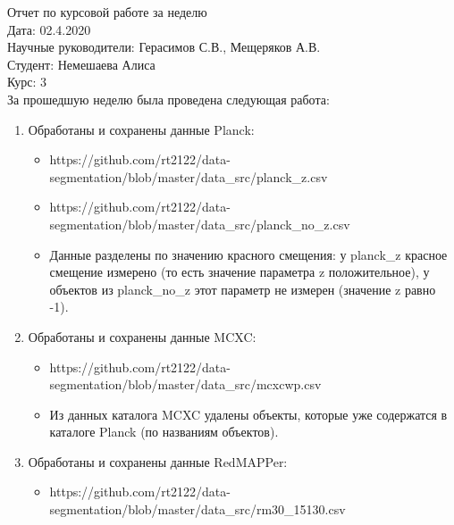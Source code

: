 \documentclass{article}
\begin{document}
Отчет по курсовой работе за неделю\\
Дата: 02.4.2020\\
Научные руководители: Герасимов С.В., Мещеряков А.В.\\
Студент: Немешаева Алиса\\
Курс: 3\\

\renewcommand{\labelitemi}{$\blacksquare$}
\renewcommand\labelitemii{$\square$}
За прошедшую неделю была проведена следующая работа:\\
\begin{enumerate}
    \item Обработаны и сохранены данные Planck: \\
        \begin{itemize}
            \item https://github.com/rt2122/data-segmentation/blob/master/data\_src/planck\_z.csv\\ 
            \item https://github.com/rt2122/data-segmentation/blob/master/data\_src/planck\_no\_z.csv\\
            \item Данные разделены по значению красного смещения: у planck\_z красное смещение измерено 
                (то есть значение параметра z положительное), у объектов из planck\_no\_z этот параметр не
                измерен (значение z равно -1).\\
        \end{itemize}
    \item Обработаны и сохранены данные MCXC: \\
        \begin{itemize}
            \item https://github.com/rt2122/data-segmentation/blob/master/data\_src/mcxcwp.csv \\
            \item Из данных каталога MCXC удалены объекты, которые уже содержатся в каталоге 
                Planck (по названиям объектов).\\
        \end{itemize}
    \item Обработаны и сохранены данные RedMAPPer: \\
        \begin{itemize}
            \item https://github.com/rt2122/data-segmentation/blob/master/data\_src/rm30\_15130.csv \\

\end{itemize}
\end{enumerate}
\end{document}
